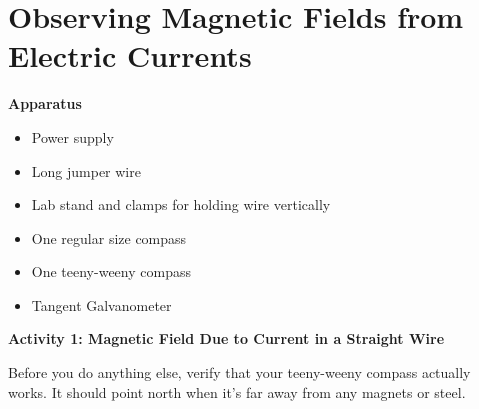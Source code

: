 \section{Observing Magnetic Fields from Electric Currents}


\makelabheader %

\bigskip
\textbf{Apparatus} 

\begin{itemize} [nosep]
\item Power supply
\item Long jumper wire 
\item Lab stand and clamps for holding wire vertically
\item One regular size compass
\item One teeny-weeny compass
\item Tangent Galvanometer
\end{itemize}

\bigskip
\textbf{Activity 1: Magnetic Field Due to Current in a Straight Wire}

Before you do anything else, verify that your teeny-weeny compass actually works.  It should point north when it's far away from any magnets or steel.  

